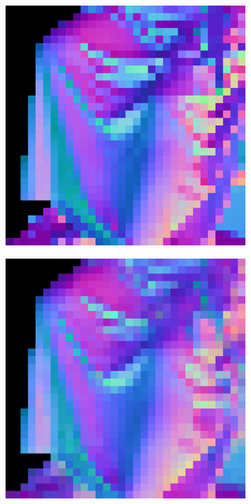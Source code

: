 \begin{figure}
\begin{subfigure}[b]{0.19\linewidth}
	\end{subfigure}
	\begin{subfigure}[b]{0.19\linewidth}
		\includegraphics[width=\linewidth]{./Figures/gcnn_synthetic/eval_3_normal_GT.png}
	\end{subfigure}
	\begin{subfigure}[b]{0.19\linewidth}
		\includegraphics[width=\linewidth]{./Figures/gcnn_synthetic/eval_3_normal_an2-8-1000.png}

\end{subfigure}
\end{figure}
